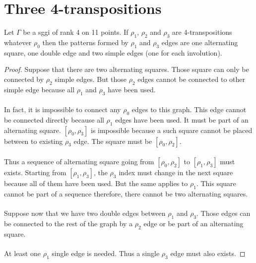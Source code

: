 \section{Three 4-transpositions}

\begin{lemma}
  Let $\Gamma$ be a sggi of rank 4 on 11 points. If $\rho_1$, $\rho_2$ and $\rho_3$ are 4-transpositions whatever $\rho_0$ then the patterns formed by $\rho_1$ and $\rho_3$ edges are one alternating square, one double edge and two simple edges (one for each involution).
\end{lemma}

\begin{proof}
  Suppose that there are two alternating squares. Those square can only be connected by $\rho_2$ simple edges. But those $\rho_2$ edges cannot be connected to other simple edge because all $\rho_1$ and $\rho_3$ have been used.

  \paragraph{}
  In fact, it is impossible to connect any $\rho_0$ edges to this graph. This edge cannot be connected directly because all $\rho_1$ edges have been used. It must be part of an alternating square. $[\rho_0, \rho_3]$ is impossible because a such square cannot be placed between to existing $\rho_3$ edge. The square must be $[\rho_0, \rho_2]$.

  \paragraph{}
  Thus a sequence of alternating square going from $[\rho_0, \rho_2]$ to $[\rho_1, \rho_3]$ must exists. Starting from $[\rho_1, \rho_3]$, the $\rho_3$ index must change in the next square because all of them have been used. But the same applies to $\rho_1$. This square cannot be part of a sequence therefore, there cannot be two alternating squares.

  \paragraph{}
  Suppose now that we have two double edges between $\rho_1$ and $\rho_3$. Those edges can be connected to the rest of the graph by a $\rho_2$ edge or be part of an alternating square.

  \paragraph{}
  At least one $\rho_1$ single edge is needed. Thus a single $\rho_3$ edge must also exists.
\end{proof}

